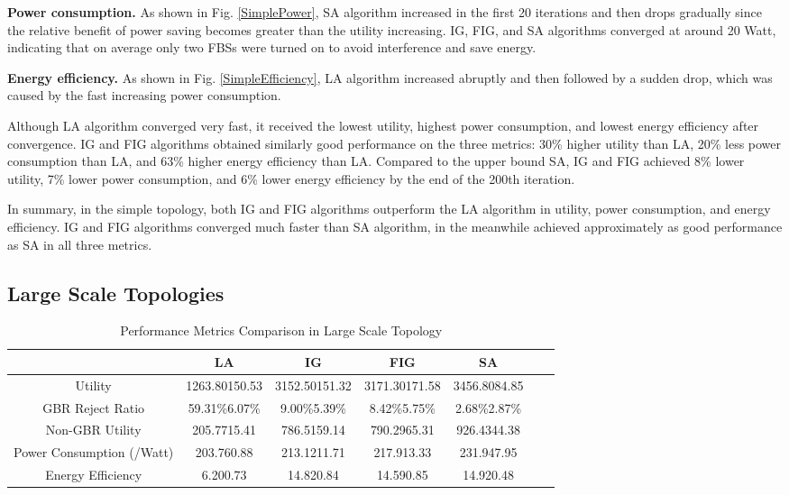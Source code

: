 \documentclass[conference]{IEEEtran}
\newcommand{\myitem}{{\setlength{\parindent}{8pt}\footnotesize{ }}}
\begin{document}
\noindent \myitem \textbf{Power consumption.} As shown in Fig. \ref{SimplePower}, SA algorithm increased in the first 20 iterations and then drops gradually since the relative benefit of power saving becomes greater than the utility increasing. IG, FIG, and SA algorithms converged at around 20 Watt, indicating that on average only two FBSs were turned on to avoid interference and save energy.

\noindent \myitem \textbf{Energy efficiency.} As shown in Fig. \ref{SimpleEfficiency}, LA algorithm increased abruptly and then followed by a sudden drop, which was caused by the fast increasing power consumption.

Although LA algorithm converged very fast, it received the lowest utility, highest power consumption, and lowest energy efficiency after convergence. IG and FIG algorithms obtained similarly good performance on the three metrics: 30\% higher utility than LA, 20\% less power consumption than LA, and 63\% higher energy efficiency than LA. Compared to the upper bound SA, IG and FIG achieved 8\% lower utility, 7\% lower power consumption, and 6\% lower energy efficiency by the end of the 200th iteration.

In summary, in the simple topology, both IG and FIG algorithms outperform the LA algorithm in utility, power consumption, and energy efficiency. IG and FIG algorithms converged much faster than SA algorithm, in the meanwhile achieved approximately as good performance as SA in all three metrics.










\subsection{Large Scale Topologies}
\begin{table*} \renewcommand{\arraystretch}{1}
\small
\begin{center}
\caption{Performance Metrics Comparison in Large Scale Topology} 
\begin{threeparttable}
	\centering 
	\begin{tabular}{|c|c|c|c|c|c|c|} 
	\hline  
	{\backslashbox{Metric}{Algorithm}  }&{LA}&{IG}&{FIG}&{SA}\\ 
	\hline
	Utility &1263.80150.53 & 3152.50151.32 & 3171.30171.58 & 3456.8084.85 \\
	\hline 
	GBR Reject Ratio &59.31\%6.07\% & 9.00\%5.39\% & 8.42\%5.75\% & 2.68\%2.87\% \\
	\hline	
	Non-GBR Utility  &205.7715.41 & 786.5159.14 & 790.2965.31 & 926.4344.38 \\
	\hline
	Power Consumption (/Watt) &203.760.88 & 213.1211.71 & 217.913.33 & 231.947.95 \\
	\hline
	Energy Efficiency &6.200.73 & 14.820.84 & 14.590.85 & 14.920.48 \\
	\hline 
	\end{tabular}
\end{threeparttable}
\label{table_Large} 
\end{center}
\end{table*}
\end{document}
